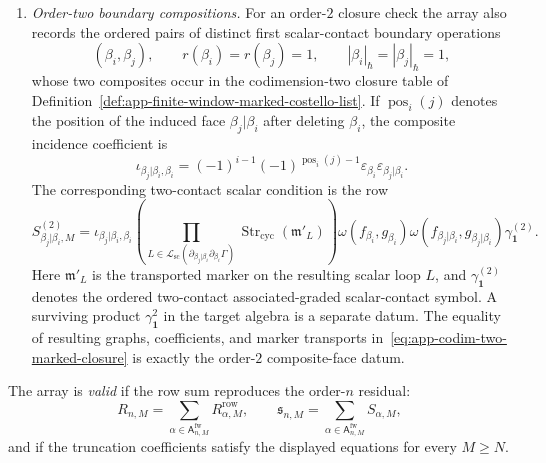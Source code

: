 \begin{defn}
\begin{enumerate}[label=(A\arabic*)]
    \item \emph{Order-two boundary compositions.}  For an order-\(2\)
    closure check the array also records the ordered pairs of distinct
    first scalar-contact boundary operations
    \[
      (\beta_i,\beta_j),\qquad
      r(\beta_i)=r(\beta_j)=1,\qquad
      |\beta_i|_\hbar=|\beta_j|_\hbar=1,
    \]
    whose two composites occur in the codimension-two closure table of
    Definition~\ref{def:app-finite-window-marked-costello-list}.  If
    \(\operatorname{pos}_i(j)\) denotes the position of the induced face
    \(\beta_j|\beta_i\) after deleting \(\beta_i\), the composite
    incidence coefficient is
    \[
      \iota_{\beta_j|\beta_i,\beta_i}
        =
      {(-1)}^{i-1}{(-1)}^{\operatorname{pos}_i(j)-1}
      \varepsilon_{\beta_i}\varepsilon_{\beta_j|\beta_i}.
    \]
    The corresponding two-contact scalar condition is the row
    \[
      S^{(2)}_{\beta_j|\beta_i,M}
        =
      \iota_{\beta_j|\beta_i,\beta_i}
      \left(
        \prod_{L\in\mathcal L_{\mathrm{sc}}
        (\partial_{\beta_j|\beta_i}\partial_{\beta_i}\Gamma)}
        \operatorname{Str}_{\mathrm{cyc}}(\mathfrak m'_L)
      \right)
      \omega(f_{\beta_i},g_{\beta_i})
      \omega(f_{\beta_j|\beta_i},g_{\beta_j|\beta_i})
      \gamma_{\mathbf 1}^{(2)}.
    \]
    Here \(\mathfrak m'_L\) is the transported marker on the resulting scalar
    loop \(L\), and \(\gamma_{\mathbf 1}^{(2)}\) denotes the ordered
    two-contact associated-graded scalar-contact symbol.  A surviving
    product \(\gamma_{\mathbf 1}^2\) in the target algebra is a separate
    datum.  The equality of resulting graphs, coefficients, and marker
    transports in~\eqref{eq:app-codim-two-marked-closure} is exactly the
    order-\(2\) composite-face datum.
  \end{enumerate}

  The array is \emph{valid} if the row sum reproduces the order-\(n\)
  residual:
  \[
    R_{n,M}
      =
    \sum_{\alpha\in\mathsf A^{\mathrm{fw}}_{n,M}}
      R_{\alpha,M}^{\mathrm{row}},
    \qquad
    \mathfrak s_{n,M}
      =
    \sum_{\alpha\in\mathsf A^{\mathrm{fw}}_{n,M}}S_{\alpha,M},
  \]
  and if the truncation coefficients satisfy the displayed equations for
  every \(M\geq N\).
\end{defn}


